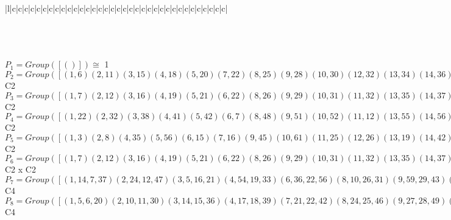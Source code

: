 \documentclass[varwidth=\maxdimen,border=10]{standalone}
\begin{document}
\begin{tabular}
\begin{array}{|l|c|c|c|c|c|c|c|c|c|c|c|c|c|c|c|c|c|c|c|c|c|c|c|c|c|c|c|c|c|c|c|c|c|c|c|}
\end{array}\)\\
\ \\
\ \\
$P_{1} = Group( [ () ] )\cong$ 1\ \\
$P_{2} = Group( [ ( 1, 6)( 2,11)( 3,15)( 4,18)( 5,20)( 7,22)( 8,25)( 9,28)(10,30)(12,32)(13,34)(14,36)(16,38)(17,39)(19,41)(21,42)(23,44)(24,46)(26,48)(27,49)(29,51)(31,52)(33,53)(35,55)(37,56)(40,57)(43,58)(45,60)(47,61)(50,62)(54,63)(59,64) ] )\cong$ C2\ \\
$P_{3} = Group( [ ( 1, 7)( 2,12)( 3,16)( 4,19)( 5,21)( 6,22)( 8,26)( 9,29)(10,31)(11,32)(13,35)(14,37)(15,38)(17,40)(18,41)(20,42)(23,45)(24,47)(25,48)(27,50)(28,51)(30,52)(33,54)(34,55)(36,56)(39,57)(43,59)(44,60)(46,61)(49,62)(53,63)(58,64) ] )\cong$ C2\ \\
$P_{4} = Group( [ ( 1,22)( 2,32)( 3,38)( 4,41)( 5,42)( 6, 7)( 8,48)( 9,51)(10,52)(11,12)(13,55)(14,56)(15,16)(17,57)(18,19)(20,21)(23,60)(24,61)(25,26)(27,62)(28,29)(30,31)(33,63)(34,35)(36,37)(39,40)(43,64)(44,45)(46,47)(49,50)(53,54)(58,59) ] )\cong$ C2\ \\
$P_{5} = Group( [ ( 1, 3)( 2, 8)( 4,35)( 5,56)( 6,15)( 7,16)( 9,45)(10,61)(11,25)(12,26)(13,19)(14,42)(17,53)(18,55)(20,37)(21,36)(22,38)(23,29)(24,52)(27,58)(28,60)(30,47)(31,46)(32,48)(33,39)(34,41)(40,63)(43,49)(44,51)(50,64)(54,57)(59,62) ] )\cong$ C2\ \\
$P_{6} = Group( [ ( 1, 7)( 2,12)( 3,16)( 4,19)( 5,21)( 6,22)( 8,26)( 9,29)(10,31)(11,32)(13,35)(14,37)(15,38)(17,40)(18,41)(20,42)(23,45)(24,47)(25,48)(27,50)(28,51)(30,52)(33,54)(34,55)(36,56)(39,57)(43,59)(44,60)(46,61)(49,62)(53,63)(58,64), ( 1, 6)( 2,11)( 3,15)( 4,18)( 5,20)( 7,22)( 8,25)( 9,28)(10,30)(12,32)(13,34)(14,36)(16,38)(17,39)(19,41)(21,42)(23,44)(24,46)(26,48)(27,49)(29,51)(31,52)(33,53)(35,55)(37,56)(40,57)(43,58)(45,60)(47,61)(50,62)(54,63)(59,64) ] )\cong$ C2 x C2\ \\
$P_{7} = Group( [ ( 1,14, 7,37)( 2,24,12,47)( 3, 5,16,21)( 4,54,19,33)( 6,36,22,56)( 8,10,26,31)( 9,59,29,43)(11,46,32,61)(13,40,35,17)(15,20,38,42)(18,63,41,53)(23,50,45,27)(25,30,48,52)(28,64,51,58)(34,57,55,39)(44,62,60,49), ( 1, 7)( 2,12)( 3,16)( 4,19)( 5,21)( 6,22)( 8,26)( 9,29)(10,31)(11,32)(13,35)(14,37)(15,38)(17,40)(18,41)(20,42)(23,45)(24,47)(25,48)(27,50)(28,51)(30,52)(33,54)(34,55)(36,56)(39,57)(43,59)(44,60)(46,61)(49,62)(53,63)(58,64) ] )\cong$ C4\ \\
$P_{8} = Group( [ ( 1, 5, 6,20)( 2,10,11,30)( 3,14,15,36)( 4,17,18,39)( 7,21,22,42)( 8,24,25,46)( 9,27,28,49)(12,31,32,52)(13,33,34,53)(16,37,38,56)(19,40,41,57)(23,43,44,58)(26,47,48,61)(29,50,51,62)(35,54,55,63)(45,59,60,64), ( 1, 6)( 2,11)( 3,15)( 4,18)( 5,20)( 7,22)( 8,25)( 9,28)(10,30)(12,32)(13,34)(14,36)(16,38)(17,39)(19,41)(21,42)(23,44)(24,46)(26,48)(27,49)(29,51)(31,52)(33,53)(35,55)(37,56)(40,57)(43,58)(45,60)(47,61)(50,62)(54,63)(59,64) ] )\cong$ C4\ \\

\end{tabular}
\end{document}
